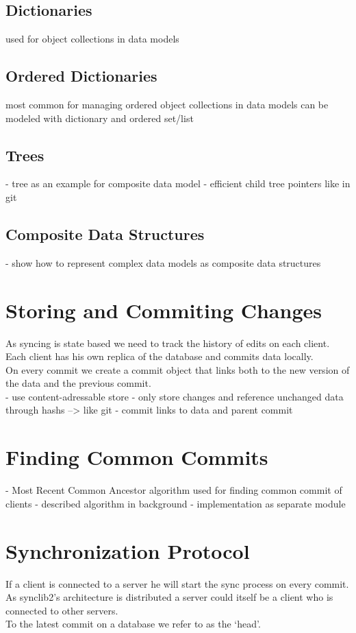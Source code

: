 \subsection{Dictionaries}
used for object collections in data models
\subsection{Ordered Dictionaries}
most common for managing ordered object collections in data models
can be modeled with dictionary and ordered set/list
\subsection{Trees}
- tree as an example for composite data model
- efficient child tree pointers like in git

\subsection{Composite Data Structures}
- show how to represent complex data models as composite data structures

\section{Storing and Commiting Changes}
As syncing is state based we need to track the history of edits on each client.\\Each client has his own replica of the database and commits
data locally.\\On every commit we create a commit object that links both
to the new version of the data and the previous commit.\\

- use content-adressable store
- only store changes and reference unchanged data through hashs --> like git
- commit links to data and parent commit

\section{Finding Common Commits}
- Most Recent Common Ancestor algorithm used for finding common commit of clients
- described algorithm in background
- implementation as separate module

\section{Synchronization Protocol}
If a client is connected to a server he will start the sync process on every commit. As
synclib2's architecture is distributed a server could itself be a client
who is connected to other servers.\\To the latest commit on a database
we refer to as the `head'.

